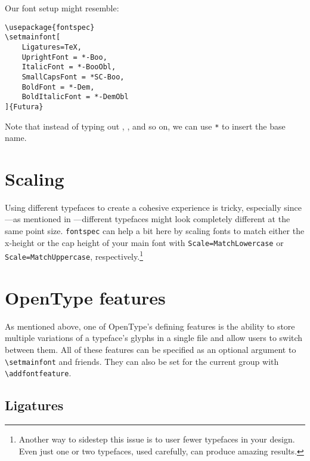 Our font setup might resemble:
\begin{leftfigure}
\begin{lstlisting}
\usepackage{fontspec}
\setmainfont[
    Ligatures=TeX,
    UprightFont = *-Boo,
    ItalicFont = *-BooObl,
    SmallCapsFont = *SC-Boo,
    BoldFont = *-Dem,
    BoldItalicFont = *-DemObl
]{Futura}
\end{lstlisting}
\end{leftfigure}
Note that instead of typing out ,
, and so on, we can use \texttt{*} to insert the base name.

\section{Scaling}

Using different typefaces to create a cohesive experience is tricky,
especially since---as mentioned in ---different typefaces
might look completely different at the same point size.
\texttt{fontspec} can help a bit here by scaling fonts to match either the
x-height or the cap height of your main font with
\verb|Scale=MatchLowercase| or \verb|Scale=MatchUppercase|,
respectively.\footnote{Another way to sidestep this issue is to user fewer
typefaces in your design. Even just one or two typefaces,
used carefully, can produce amazing results.}


\section{OpenType features}

As mentioned above, one of OpenType's defining features is the ability to store
multiple variations of a typeface's glyphs in a single file and allow users
to switch between them.
All of these features can be specified as an optional argument to
\verb|\setmainfont| and friends.
They can also be set for the current group with
\verb|\addfontfeature|.

\subsection{Ligatures}

